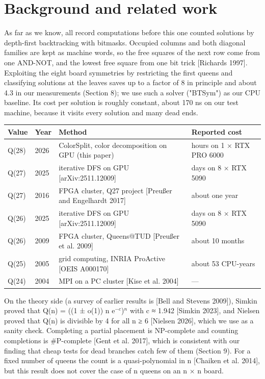 \section{Background and related work}

As far as we know, all record computations before this one counted solutions by depth-first backtracking with bitmasks. Occupied columns and both diagonal families are kept as machine words, so the free squares of the next row come from one AND-NOT, and the lowest free square from one bit trick [Richards 1997]. Exploiting the eight board symmetries by restricting the first queens and classifying solutions at the leaves saves up to a factor of 8 in principle and about 4.3 in our measurements (Section 8); we use such a solver ("BTSym") as our CPU baseline. Its cost per solution is roughly constant, about 170 ns on our test machine, because it visits every solution and many dead ends.

\begin{table}[htbp]\centering\small
\begin{tabularx}{\textwidth}{ll>{\raggedright\arraybackslash}X>{\raggedright\arraybackslash}p{}}\toprule
Value & Year & Method & Reported cost \\\midrule
Q(28) & 2026 & ColorSplit, color decomposition on GPU (this paper) & 436 hours on 1 × RTX PRO 6000 \\
Q(27) & 2025 & iterative DFS on GPU [arXiv:2511.12009] & 28.4 days on 8 × RTX 5090 \\
Q(27) & 2016 & FPGA cluster, Q27 project [Preußer and Engelhardt 2017] & about one year \\
Q(26) & 2025 & iterative DFS on GPU [arXiv:2511.12009] & 2.5 days on 8 × RTX 5090 \\
Q(26) & 2009 & FPGA cluster, Queens@TUD [Preußer et al. 2009] & about 10 months \\
Q(25) & 2005 & grid computing, INRIA ProActive [OEIS A000170] & about 53 CPU-years \\
Q(24) & 2004 & MPI on a PC cluster [Kise et al. 2004] & — \\
\bottomrule
\end{tabularx}
\end{table}

On the theory side (a survey of earlier results is [Bell and Stevens 2009]), Simkin proved that Q(n) = ((1 ± o(1)) n e$^{-c}$)$^{n}$ with c ≈ 1.942 [Simkin 2023], and Nielsen proved that Q(n) is divisible by 4 for all n ≥ 6 [Nielsen 2026], which we use as a sanity check. Completing a partial placement is NP-complete and counting completions is \#P-complete [Gent et al. 2017], which is consistent with our finding that cheap tests for dead branches catch few of them (Section 9). For a fixed number of queens the count is a quasi-polynomial in n [Chaiken et al. 2014], but this result does not cover the case of n queens on an n × n board.


